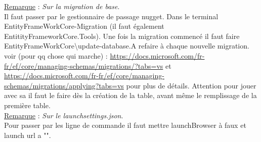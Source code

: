 \documentclass[a4paper,12pt,twoside]{article}
\newcommand{\rem}[2]{\noindent\underline{Remarque} : \textit{#1}.\\ \indent #2}
\begin{document}
\rem{Sur la migration de base}{Il faut passer par le gestionnaire de passage nugget. Dans le terminal EntityFrameWorkCore\Add-Migration (il faut également EntitityFrameworkCore.Tools). Une fois la migration commencé il faut faire EntityFrameWorkCore\textbackslash update-database.A refaire à chaque nouvelle migration. voir (pour qq chose qui marche) : \url{https://docs.microsoft.com/fr-fr/ef/core/managing-schemas/migrations/?tabs=vs} et \url{https://docs.microsoft.com/fr-fr/ef/core/managing-schemas/migrations/applying?tabs=vs} pour plus de détails. Attention pour jouer avec sa il faut le faire dès la création de la table, avant même le remplissage de la première table.}\\

\rem{Sur le launchsettings.json}{Pour passer par les ligne de commande il faut mettre launchBrowser à faux et launch url a "".}\\
\newpage
\printglossary[type=\acronymtype]%
\glsaddallunused %
\printglossary[type = main,nonumberlist]%
\end{document}
